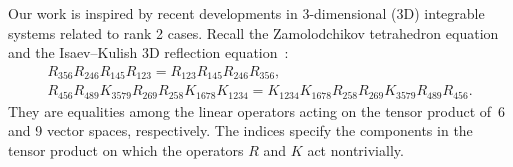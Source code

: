 Our work is inspired by recent developments in
3-dimensional (3D) integrable systems related to
rank 2 cases.
Recall the Zamolodchikov tetrahedron equation~\cite{Zam80}
and the Isaev--Kulish 3D ref\/lection equation~\cite{IK}:
\begin{gather}
{R}_{356}{R}_{246}{R}_{145}{R}_{123}
={R}_{123}{R}_{145}{R}_{246}{R}_{356}, \label{a:teq}\\
{R}_{456}{R}_{489}
{K}_{3579}{R}_{269}{R}_{258}
{K}_{1678}{K}_{1234}
={K}_{1234}
{K}_{1678}
{R}_{258}{R}_{269}
{K}_{3579}{R}_{489}{R}_{456}.\label{a:3dref}
\end{gather}
They are equalities among the linear operators acting on the
tensor product of~6 and 9 vector spaces, respectively.
The indices specify the components in the tensor product
on which the operators $R$ and $K$ act nontrivially.
